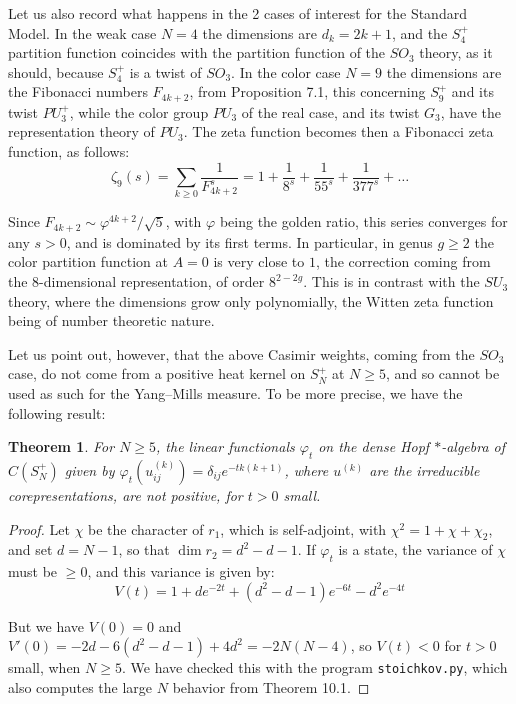 \documentclass[11pt]{amsart}
\newtheorem{theorem}{Theorem}[section]
\theoremstyle{definition}
\begin{document}
Let us also record what happens in the 2 cases of interest for the Standard Model. In the weak case $N=4$ the dimensions are $d_k=2k+1$, and the $S_4^+$ partition function coincides with the partition function of the $SO_3$ theory, as it should, because $S_4^+$ is a twist of $SO_3$. In the color case $N=9$ the dimensions are the Fibonacci numbers $F_{4k+2}$, from Proposition 7.1, this concerning $S_9^+$ and its twist $PU_3^+$, while the color group $PU_3$ of the real case, and its twist $G_3$, have the representation theory of $PU_3$. The zeta function becomes then a Fibonacci zeta function, as follows:
$$\zeta_9(s)=\sum_{k\geq0}\frac{1}{F_{4k+2}^s}=1+\frac{1}{8^s}+\frac{1}{55^s}+\frac{1}{377^s}+\ldots$$

Since $F_{4k+2}\sim\varphi^{4k+2}/\sqrt{5}$, with $\varphi$ being the golden ratio, this series converges for any $s>0$, and is dominated by its first terms. In particular, in genus $g\geq2$ the color partition function at $A=0$ is very close to $1$, the correction coming from the $8$-dimensional representation, of order $8^{2-2g}$. This is in contrast with the $SU_3$ theory, where the dimensions grow only polynomially, the Witten zeta function being of number theoretic nature.

Let us point out, however, that the above Casimir weights, coming from the $SO_3$ case, do not come from a positive heat kernel on $S_N^+$ at $N\geq5$, and so cannot be used as such for the Yang--Mills measure. To be more precise, we have the following result:

\begin{theorem}
For $N\geq5$, the linear functionals $\varphi_t$ on the dense Hopf $*$-algebra of $C(S_N^+)$ given by $\varphi_t(u^{(k)}_{ij})=\delta_{ij}e^{-tk(k+1)}$, where $u^{(k)}$ are the irreducible corepresentations, are not positive, for $t>0$ small.
\end{theorem}

\begin{proof}
Let $\chi$ be the character of $r_1$, which is self-adjoint, with $\chi^2=1+\chi+\chi_2$, and set $d=N-1$, so that $\dim r_2=d^2-d-1$. If $\varphi_t$ is a state, the variance of $\chi$ must be $\geq0$, and this variance is given by:
$$V(t)=1+de^{-2t}+(d^2-d-1)e^{-6t}-d^2e^{-4t}$$

But we have $V(0)=0$ and $V'(0)=-2d-6(d^2-d-1)+4d^2=-2N(N-4)$, so $V(t)<0$ for $t>0$ small, when $N\geq5$. We have checked this with the program {\tt stoichkov.py}, which also computes the large $N$ behavior from Theorem 10.1.
\end{proof}
\end{document}
